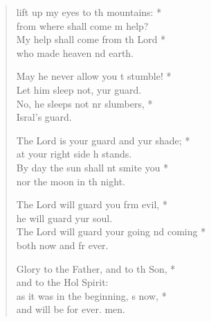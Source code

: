 \settowidth{\versewidth}{The Lord will guard your going and coming * *}
\begin{verse}%
  \begin{patverse}
 lift up my eyes to th mountains: *\Med\\
from where shall come m help?\\
My help shall come from th Lord *\Med\\
who made heaven nd earth.

May he never allow you t stumble! *\Med\\
Let him sleep not, yur guard.\\
No, he sleeps not nr slumbers, *\Med\\
Isral’s guard.

The Lord is your guard and yur shade; *\Med\\
at your right side h stands.\\
By day the sun shall nt smite you *\Med\\
nor the moon in th night.

The Lord will guard you frm evil, *\Med\\
he will guard yur soul.\\
The Lord will guard your going nd coming *\Med\\
both now and fr ever.

Glory to the Father, and to th Son, *\Med\\
and to the Hol Spirit:\\
as it was in the beginning, \pointup{\i}s now, *\Med\\
and will be for ever. men.
  \end{patverse}
\end{verse}
